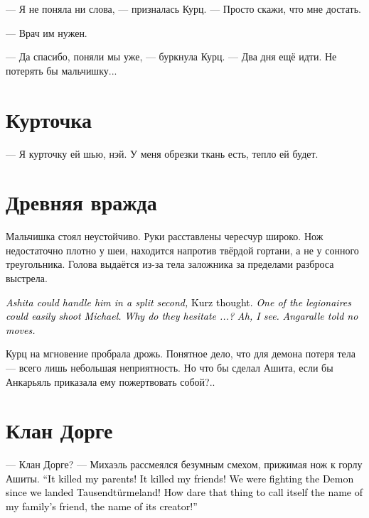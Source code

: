 \documentclass[a4paper,10pt,fleqn]{book}\usepackage{polyglossia}\setdefaultlanguage{english}\setotherlanguage{russian}\defaultfontfeatures{Ligatures=TeX,Mapping=tex-text}\usepackage{xcolor}\definecolor{lightgray}{HTML}{bbbbbb}\color{lightgray}\newcommand{\ml}[3]{\textcolor{black}{#3}}
\begin{document}
--- Я не поняла ни слова, --- призналась Курц.
--- Просто скажи, что мне достать.

--- Врач им нужен.

--- Да спасибо, поняли мы уже, --- буркнула Курц.
--- Два дня ещё идти.
Не потерять бы мальчишку...

\section{Курточка}

--- Я курточку ей шью, нэй.
У меня обрезки ткань есть, тепло ей будет.

\section{Древняя вражда}

Мальчишка стоял неустойчиво.
Руки расставлены чересчур широко.
Нож недостаточно плотно у шеи, находится напротив твёрдой гортани, а не у сонного треугольника.
Голова выдаётся из-за тела заложника за пределами разброса выстрела.

\ml{$0$}
{<<Ашита мог бы справиться с ним в долю секунды, --- думала Курц.}
{\textit{Ashita could handle him in a split second,} Kurz thought.}
\ml{$0$}
{--- Кто-то из легионеров может легко пристрелить Михаэля.}
{\textit{One of the legionaires could easily shoot Michael.}}
\ml{$0$}
{Почему же они медлят?..}
{\textit{Why do they hesitate ...?}}
\ml{$0$}
{А, ясно.}
{\textit{Ah, I see.}}
\ml{$0$}
{Анкарьяль велела ничего не предпринимать>>.}
{\textit{Angaralle told no moves.}}

Курц на мгновение пробрала дрожь.
Понятное дело, что для демона потеря тела --- всего лишь небольшая неприятность.
Но что бы сделал Ашита, если бы Анкарьяль приказала ему пожертвовать собой?..

\section{Клан Дорге}

--- Клан Дорге? --- Михаэль рассмеялся безумным смехом, прижимая нож к горлу Ашиты.
\ml{$0$}
{--- Он убил моих родителей!}
{``It killed my parents!}
\ml{$0$}
{Он убил моих друзей!}
{It killed my friends!}
\ml{$0$}
{Мы вели с Демоном войну с того момента, как ступили на Таузендтурмеланд!}
{We were fighting the Demon since we landed Tausendt\"{u}rmeland!}
\ml{$0$}
{Как смеет это существо называться именем друга моей семьи, своего создателя?}
{How dare that thing to call itself the name of my family's friend, the name of its creator!''}
\end{document}
